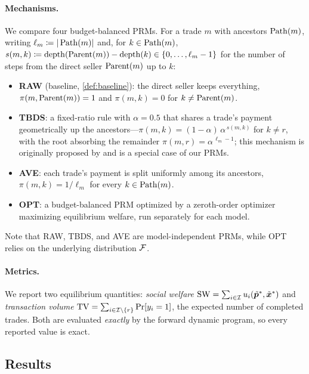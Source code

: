 \paragraph{Mechanisms.}
We compare four budget-balanced PRMs. For a trade $m$ with ancestors $\operatorname{Path}(m)$, writing $\ell_m \coloneqq |\operatorname{Path}(m)|$ and, for $k \in \operatorname{Path}(m)$, $s(m,k) \coloneqq \mathrm{depth}(\operatorname{Parent}(m)) - \mathrm{depth}(k) \in \{0,\ldots,\ell_m-1\}$ for the number of steps from the direct seller $\operatorname{Parent}(m)$ up to $k$:
\begin{itemize}[left=0em]\itemsep0.1em
\item \textbf{RAW} (baseline, \cref{def:baseline}): the direct seller keeps everything, $\pi(m,\operatorname{Parent}(m)) = 1$ and $\pi(m,k) = 0$ for $k \neq \operatorname{Parent}(m)$.
\item \textbf{TBDS}: a fixed-ratio rule with $\alpha = 0.5$ that shares a trade's payment geometrically up the ancestors---$\pi(m,k) = (1-\alpha)\,\alpha^{\,s(m,k)}$ for $k \neq r$, with the root absorbing the remainder $\pi(m,r) = \alpha^{\,\ell_m-1}$; this mechanism is originally proposed by \citet{xin2025tbds} and is a special case of our PRMs.
\item \textbf{AVE}: each trade's payment is split uniformly among its ancestors, $\pi(m,k) = 1/\ell_m$ for every $k \in \operatorname{Path}(m)$.
\item \textbf{OPT}: a budget-balanced PRM optimized by a zeroth-order optimizer maximizing equilibrium welfare, run separately for each model.
\end{itemize}

Note that RAW, TBDS, and AVE are model-independent PRMs, while OPT relies on the underlying distribution $\mathcal{F}$.


\paragraph{Metrics.}
We report two equilibrium quantities: \emph{social welfare} $\mathrm{SW}=\sum_{i\in\mathcal{I}}u_i(\tilde{{\bm{p}}}^*,\tilde{{\bm{x}}}^*)$ and \emph{transaction volume} $\mathrm{TV}=\sum_{i\in\mathcal{I}\setminus\{r\}}\Pr[y_i=1]$, the expected number of completed trades. Both are evaluated \emph{exactly} by the forward dynamic program, so every reported value is exact.

\subsection{Results}




